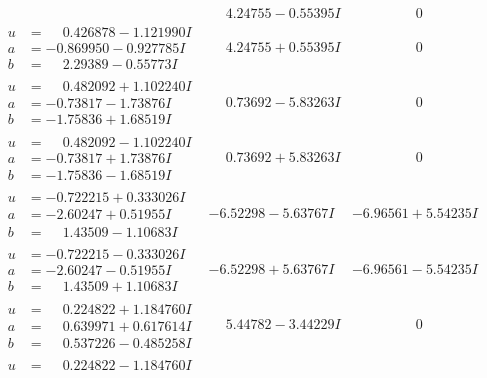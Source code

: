 \documentclass[1p]{elsarticle_modified}
\theoremstyle{definition}
\begin{document}
$$\begin{array}{c|c|c}
 & \phantom{-}4.24755 - 0.55395 I & \phantom{-0.000000 } 0 \\ \hline\begin{aligned}
u &= \phantom{-}0.426878 - 1.121990 I \\
a &= -0.869950 - 0.927785 I \\
b &= \phantom{-}2.29389 - 0.55773 I\end{aligned}
 & \phantom{-}4.24755 + 0.55395 I & \phantom{-0.000000 } 0 \\ \hline\begin{aligned}
u &= \phantom{-}0.482092 + 1.102240 I \\
a &= -0.73817 - 1.73876 I \\
b &= -1.75836 + 1.68519 I\end{aligned}
 & \phantom{-}0.73692 - 5.83263 I & \phantom{-0.000000 } 0 \\ \hline\begin{aligned}
u &= \phantom{-}0.482092 - 1.102240 I \\
a &= -0.73817 + 1.73876 I \\
b &= -1.75836 - 1.68519 I\end{aligned}
 & \phantom{-}0.73692 + 5.83263 I & \phantom{-0.000000 } 0 \\ \hline\begin{aligned}
u &= -0.722215 + 0.333026 I \\
a &= -2.60247 + 0.51955 I \\
b &= \phantom{-}1.43509 - 1.10683 I\end{aligned}
 & -6.52298 - 5.63767 I & -6.96561 + 5.54235 I \\ \hline\begin{aligned}
u &= -0.722215 - 0.333026 I \\
a &= -2.60247 - 0.51955 I \\
b &= \phantom{-}1.43509 + 1.10683 I\end{aligned}
 & -6.52298 + 5.63767 I & -6.96561 - 5.54235 I \\ \hline\begin{aligned}
u &= \phantom{-}0.224822 + 1.184760 I \\
a &= \phantom{-}0.639971 + 0.617614 I \\
b &= \phantom{-}0.537226 - 0.485258 I\end{aligned}
 & \phantom{-}5.44782 - 3.44229 I & \phantom{-0.000000 } 0 \\ \hline\begin{aligned}
u &= \phantom{-}0.224822 - 1.184760 I \\

\end{aligned}
\end{array}$$
\end{document}
